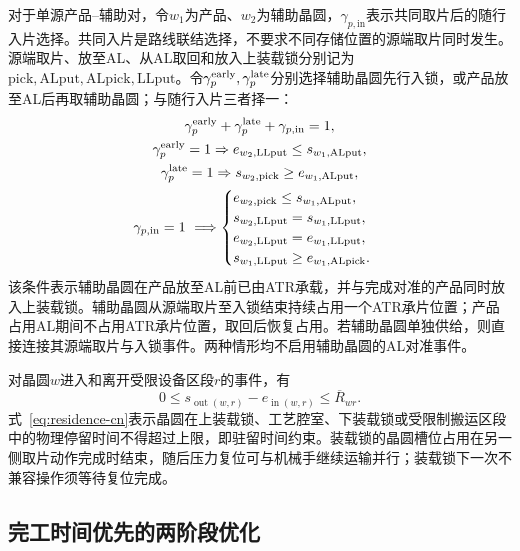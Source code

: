 \documentclass[final,5p,times,twocolumn]{elsarticle}
\begin{document}
对于单源产品--辅助对，令$w_1$为产品、$w_2$为辅助晶圆，$\gamma_{p,\mathrm{in}}$表示共同取片后的随行入片选择。共同入片是路线联结选择，不要求不同存储位置的源端取片同时发生。源端取片、放至AL、从AL取回和放入上装载锁分别记为$\mathrm{pick,ALput,ALpick,LLput}$。令$\gamma^{\rm early}_p,\gamma^{\rm late}_p$分别选择辅助晶圆先行入锁，或产品放至AL后再取辅助晶圆；与随行入片三者择一：
\begin{equation}
\begin{gathered}
\gamma^{\rm early}_p+\gamma^{\rm late}_p+\gamma_{p,\mathrm{in}}=1,\\
\gamma^{\rm early}_p=1\Rightarrow e_{w_2,\mathrm{LLput}}\le s_{w_1,\mathrm{ALput}},\\
\gamma^{\rm late}_p=1\Rightarrow s_{w_2,\mathrm{pick}}\ge e_{w_1,\mathrm{ALput}},\\
\gamma_{p,\mathrm{in}}=1\ \Longrightarrow
\begin{cases}
e_{w_2,\mathrm{pick}}\le s_{w_1,\mathrm{ALput}},\\
s_{w_2,\mathrm{LLput}}=s_{w_1,\mathrm{LLput}},\\
e_{w_2,\mathrm{LLput}}=e_{w_1,\mathrm{LLput}},\\
s_{w_1,\mathrm{LLput}}\ge e_{w_1,\mathrm{ALpick}}.
\end{cases}\end{gathered}
\label{eq:single-source-accompany-cn}
\end{equation}
该条件表示辅助晶圆在产品放至AL前已由ATR承载，并与完成对准的产品同时放入上装载锁。辅助晶圆从源端取片至入锁结束持续占用一个ATR承片位置；产品占用AL期间不占用ATR承片位置，取回后恢复占用。若辅助晶圆单独供给，则直接连接其源端取片与入锁事件。两种情形均不启用辅助晶圆的AL对准事件。

对晶圆$w$进入和离开受限设备区段$r$的事件，有
\begin{equation}
0\le s_{\operatorname{out}(w,r)}-e_{\operatorname{in}(w,r)}
\le\overline R_{wr}.
\label{eq:residence-cn}
\end{equation}
式~\eqref{eq:residence-cn}表示晶圆在上装载锁、工艺腔室、下装载锁或受限制搬运区段中的物理停留时间不得超过上限，即驻留时间约束。装载锁的晶圆槽位占用在另一侧取片动作完成时结束，随后压力复位可与机械手继续运输并行；装载锁下一次不兼容操作须等待复位完成。

\subsection{完工时间优先的两阶段优化}
\end{document}
